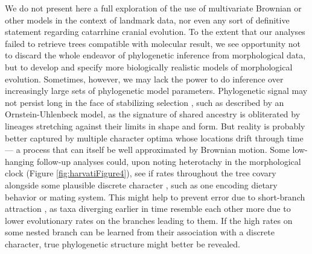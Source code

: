 We do not present here a full exploration of the use of multivariate Brownian or other models in the context of landmark data, nor even any sort of definitive statement regarding catarrhine cranial evolution. To the extent that our analyses failed to retrieve trees compatible with molecular result, we see opportunity not to discard the whole endeavor of phylogenetic inference from morphological data, but to develop and specify more biologically realistic models of morphological evolution. Sometimes, however, we may lack the power to do inference over increasingly large sets of phylogenetic model parameters. Phylogenetic signal may not persist long in the face of stabilizing selection \citep{varon-gonzalezEstimatingPhylogeniesShape2020}, such as described by an Ornstein-Uhlenbeck model, as the signature of shared ancestry is obliterated by lineages stretching against their limits in shape and form. But reality is probably better captured by multiple character optima whose locations drift through time --- a process that can itself be well approximated by Brownian motion. Some low-hanging follow-up analyses could, upon noting heterotachy in the morphological clock (Figure \ref{fig:harvatiFigure4}), see if rates throughout the tree covary alongside some plausible discrete character \citep{mayBayesianApproachInferring2020}, such as one encoding dietary behavior or mating system. This might help to prevent error due to short-branch attraction \citep{philippeHeterotachyLongbranchAttraction2005}, as taxa diverging earlier in time resemble each other more due to lower evolutionary rates on the branches leading to them. If the high rates on some nested branch can be learned from their association with a discrete character, true phylogenetic structure might better be revealed. 

